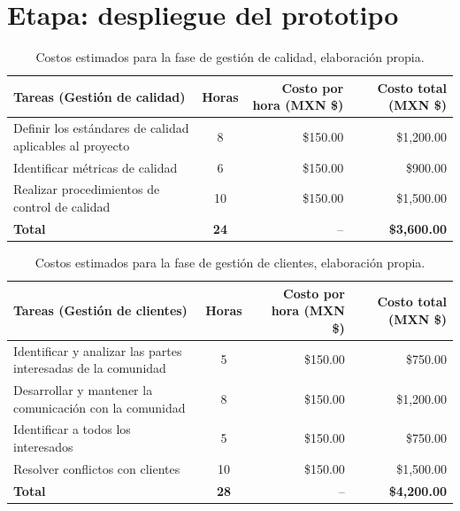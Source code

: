 \section{Etapa: despliegue del prototipo}
\begin{table}[H]
	\centering
	\renewcommand{\arraystretch}{1.6}
	\setlength{\tabcolsep}{10pt}
	\Huge
	\begin{adjustbox}{max width=\textwidth}
		\begin{tabular}{|p{9.5cm}|c|r|r|}
			\hline
			\textbf{Tareas (Gestión de calidad)} & \textbf{Horas} & \textbf{Costo por hora (MXN \$)} & \textbf{Costo total (MXN \$)} \\ \hline
			Definir los estándares de calidad aplicables al proyecto & 8 & \$150.00 & \$1,200.00 \\ \hline
			Identificar métricas de calidad & 6 & \$150.00 & \$900.00 \\ \hline
			Realizar procedimientos de control de calidad & 10 & \$150.00 & \$1,500.00 \\ \hline
			\textbf{Total} & \textbf{24} & -- & \textbf{\$3,600.00} \\ \hline
		\end{tabular}
	\end{adjustbox}
	\caption[Costos estimados para la fase de gestión de calidad]{Costos estimados para la fase de gestión de calidad, elaboración propia.} 	
	\label{tab:costos_calidad_nuevo}
\end{table}

\begin{table}[H]
	\centering
	\renewcommand{\arraystretch}{1.6}
	\setlength{\tabcolsep}{10pt}
	\Huge
	\begin{adjustbox}{max width=\textwidth}
		\begin{tabular}{|p{9.5cm}|c|r|r|}
			\hline
			\textbf{Tareas (Gestión de clientes)} & \textbf{Horas} & \textbf{Costo por hora (MXN \$)} & \textbf{Costo total (MXN \$)} \\ \hline
			Identificar y analizar las partes interesadas de la comunidad & 5 & \$150.00 & \$750.00 \\ \hline
			Desarrollar y mantener la comunicación con la comunidad & 8 & \$150.00 & \$1,200.00 \\ \hline
			Identificar a todos los interesados & 5 & \$150.00 & \$750.00 \\ \hline
			Resolver conflictos con clientes & 10 & \$150.00 & \$1,500.00 \\ \hline
			\textbf{Total} & \textbf{28} & -- & \textbf{\$4,200.00} \\ \hline
		\end{tabular}
	\end{adjustbox}
	\caption[Costos estimados para la fase de gestión de clientes]{Costos estimados para la fase de gestión de clientes, elaboración propia.} 	
	\label{tab:costos_clientes_nuevo}
\end{table}

